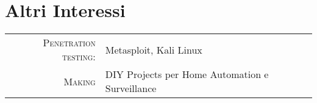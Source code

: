 %
%
%

\section{\texorpdfstring{\color{Blue}Altri Interessi}{Centres d'intérêts}}
\begin{tabular}{rl}
    \textsc{Penetration testing:} & Metasploit, Kali Linux\\
    \textsc{Making} & DIY Projects per Home Automation e Surveillance \\
\end{tabular}
